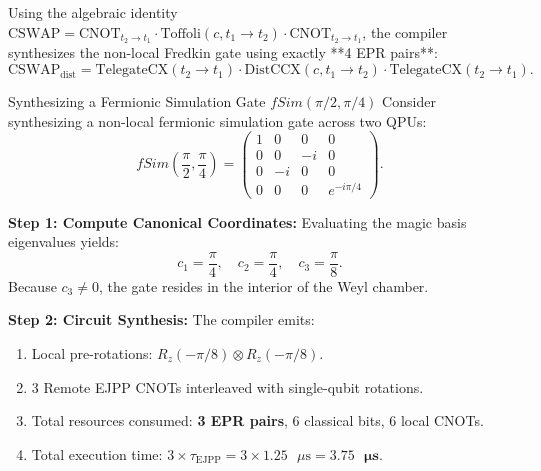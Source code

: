 Using the algebraic identity $\text{CSWAP} = \text{CNOT}_{t_2 \to t_1} \cdot \text{Toffoli}(c, t_1 \to t_2) \cdot \text{CNOT}_{t_2 \to t_1}$, the compiler synthesizes the non-local Fredkin gate using exactly **4 EPR pairs**:
\begin{equation}
    \text{CSWAP}_{\text{dist}} = \text{TelegateCX}(t_2 \to t_1) \cdot \text{DistCCX}(c, t_1 \to t_2) \cdot \text{TelegateCX}(t_2 \to t_1).
    \label{eq:distributed_fredkin_expansion}
\end{equation}


\begin{examplebox}{Synthesizing a Fermionic Simulation Gate $fSim(\pi/2, \pi/4)$}
Consider synthesizing a non-local fermionic simulation gate across two QPUs:
\begin{equation}
    fSim\left(\frac{\pi}{2}, \frac{\pi}{4}\right) = \begin{pmatrix} 1 & 0 & 0 & 0 \\ 0 & 0 & -i & 0 \\ 0 & -i & 0 & 0 \\ 0 & 0 & 0 & e^{-i \pi/4} \end{pmatrix}.
\end{equation}

\textbf{Step 1: Compute Canonical Coordinates:}
Evaluating the magic basis eigenvalues yields:
\begin{equation}
    c_1 = \frac{\pi}{4}, \quad c_2 = \frac{\pi}{4}, \quad c_3 = \frac{\pi}{8}.
\end{equation}
Because $c_3 \neq 0$, the gate resides in the interior of the Weyl chamber.

\textbf{Step 2: Circuit Synthesis:}
The compiler emits:
\begin{enumerate}
    \item Local pre-rotations: $R_z(-\pi/8) \otimes R_z(-\pi/8)$.
    \item 3 Remote EJPP CNOTs interleaved with single-qubit rotations.
    \item Total resources consumed: \textbf{3 EPR pairs}, 6 classical bits, 6 local CNOTs.
    \item Total execution time: $3 \times \tau_{\text{EJPP}} = 3 \times 1.25\text{ }\mu\text{s} = \mathbf{3.75\text{ }\mu\text{s}}$.
\end{enumerate}
\end{examplebox}

